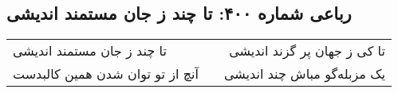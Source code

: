 \begin{center}
\section*{رباعی شماره ۴۰۰: تا چند ز جان مستمند اندیشی}
\label{sec:sh400}
\begin{longtable}{l p{0.5cm} r}
تا چند ز جان مستمند اندیشی
&&
تا کی ز جهان پر گزند اندیشی
\\
آنچ از تو توان شدن همین کالبدست
&&
یک مزبله‌گو مباش چند اندیشی
\\
\end{longtable}
\end{center}
